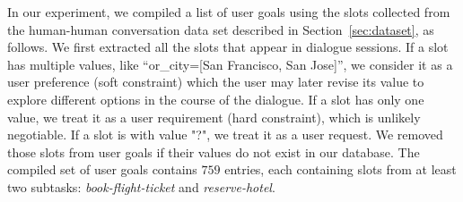 \documentclass[11pt,letterpaper]{article}
\begin{document}
In our experiment, we compiled a list of user goals using the slots collected from the human-human conversation data set described in Section~\ref{sec:dataset}, as follows. We first extracted all the slots that appear in dialogue sessions. If a slot has multiple values, like ``\textsf{or\_city=[San Francisco, San Jose]}'', we consider it as a user preference (soft constraint) which the user may later revise its value to explore different options in the course of the dialogue. If a slot has only one value, we treat it as a user requirement (hard constraint), which is unlikely negotiable. If a slot is with value \textsf{"?"}, we treat it as a user request. We removed those slots from user goals if their values do not exist in our database. The compiled set of user goals contains $759$ entries, each containing slots from at least two subtasks: \emph{book-flight-ticket} and \emph{reserve-hotel}.
\end{document}
